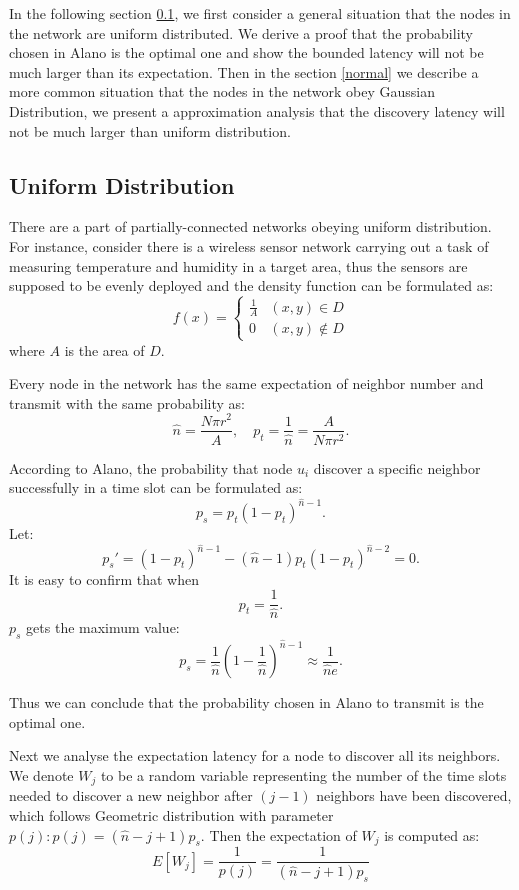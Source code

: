 In the following section \ref{uniform}, we first consider a general situation that the nodes
in the network are uniform distributed. We derive a proof that the probability
chosen in Alano is the optimal one and show the bounded latency will not 
be much larger than its expectation. Then in the section  \ref{normal} we describe a more
common situation that the nodes in the network obey Gaussian Distribution, we present a 
approximation analysis that the discovery latency will not be much larger than uniform distribution.


\subsection{Uniform Distribution}
\label{uniform}
There are a part of partially-connected networks obeying uniform distribution. 
For instance, consider there is a  wireless sensor network carrying out a task of
measuring temperature and humidity in a target area, 
thus the sensors are supposed to be evenly deployed and the density function can be 
formulated as:
$$f(x)=
\begin{cases}
\frac{1}{A}& (x,y)\in D\\
0& (x,y)\notin D
\end{cases}$$
where $A$ is the area of $D$.

Every node in the network has the same expectation 
of neighbor number and transmit with the same probability as:
$$
\hat{n} = \frac{N\pi r^2}{A}, \quad p_t = \frac{1}{\hat{n}}=\frac{A}{N\pi r^2}.
$$  

According to Alano, the probability that node $u_i$ discover a specific
neighbor successfully in a time slot can be formulated as:
$$
p_s = p_t{(1-p_t)}^{\hat{n}-1}.
$$
Let:
$$
p_s' = {(1-p_t)}^{\hat{n}-1}-(\hat{n}-1)p_t{(1-p_t)}^{\hat{n}-2}=0.
$$
It is easy to confirm that  when
$$p_t=\frac{1}{\hat{n}}.$$ 
$p_s$ gets the maximum value:
$$p_s = \frac{1}{\hat{n}}{(1-\frac{1}{\hat{n}})}^{\hat{n}-1} \approx \frac{1}{\hat{n}e}.$$

Thus we can conclude that the probability chosen in Alano
to transmit is the optimal one. 

Next we analyse the expectation latency for a node to discover all its 
neighbors. We denote $W_j$ to be a random variable representing the number of the time slots 
needed to discover a new neighbor after $(j-1)$ neighbors have been discovered, which follows 
Geometric distribution with parameter $p(j): p(j)=(\hat{n}-j+1)p_s$. Then the expectation
of $W_j$ is computed as:
$$
E[W_j]=\frac{1}{p(j)}=\frac{1}{(\hat{n}-j+1)p_s}
$$

